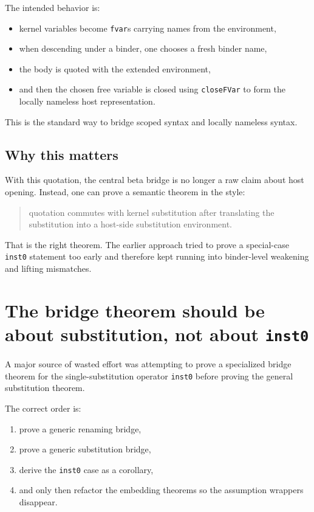 \documentclass[11pt]{article}
\begin{document}
The intended behavior is:

\begin{itemize}
  \item kernel variables become \texttt{fvar}s carrying names from the environment,
  \item when descending under a binder, one chooses a fresh binder name,
  \item the body is quoted with the extended environment,
  \item and then the chosen free variable is closed using \texttt{closeFVar} to form the locally nameless host representation.
\end{itemize}

This is the standard way to bridge scoped syntax and locally nameless syntax.

\subsection{Why this matters}

With this quotation, the central beta bridge is no longer a raw claim about host opening. Instead, one can prove a semantic theorem in the style:

\begin{quote}
quotation commutes with kernel substitution after translating the substitution into a host-side substitution environment.
\end{quote}

That is the right theorem. The earlier approach tried to prove a special-case \texttt{inst0} statement too early and therefore kept running into binder-level weakening and lifting mismatches.

\section{The bridge theorem should be about substitution, not about \texttt{inst0}}

A major source of wasted effort was attempting to prove a specialized bridge theorem for the single-substitution operator \texttt{inst0} before proving the general substitution theorem.

The correct order is:

\begin{enumerate}
  \item prove a generic renaming bridge,
  \item prove a generic substitution bridge,
  \item derive the \texttt{inst0} case as a corollary,
  \item and only then refactor the embedding theorems so the assumption wrappers disappear.
\end{enumerate}
\end{document}
